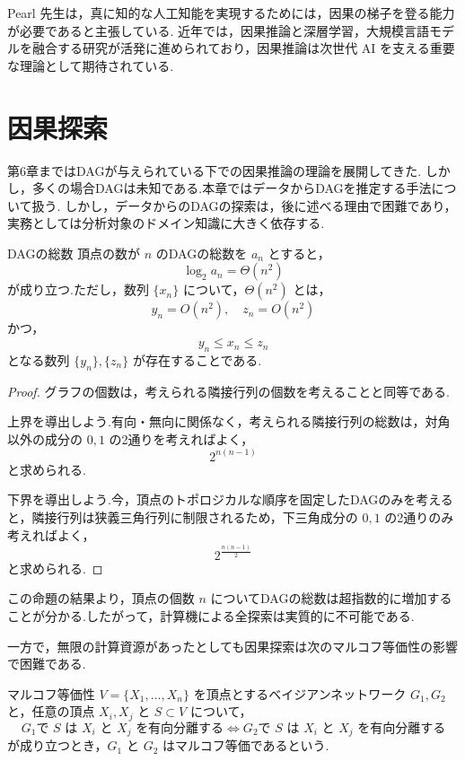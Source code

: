 \documentclass[uplatex, dvipdfmx]{jsarticle}
\begin{document}
Pearl 先生は，真に知的な人工知能を実現するためには，因果の梯子を登る能力が必要であると主張している.
近年では，因果推論と深層学習，大規模言語モデルを融合する研究が活発に進められており，因果推論は次世代 AI を支える重要な理論として期待されている.

\newpage

\section{因果探索}

第6章まではDAGが与えられている下での因果推論の理論を展開してきた.
しかし，多くの場合DAGは未知である.本章ではデータからDAGを推定する手法について扱う.
しかし，データからのDAGの探索は，後に述べる理由で困難であり，実務としては分析対象のドメイン知識に大きく依存する.

\begin{prop}{DAGの総数}
  頂点の数が $n$ のDAGの総数を $a_n$ とすると，
  \[
    \log_2 a_n=\Theta(n^2)
  \]
  が成り立つ.ただし，数列 $\{x_n\}$ について，$\Theta(n^2)$ とは，
  \[
    y_n=O(n^2),\quad
    z_n=O(n^2)
  \]
  かつ，
  \[
    y_n\le x_n\le z_n
  \]
  となる数列 $\{y_n\},\{z_n\}$ が存在することである.
\end{prop}

\begin{proof}
  グラフの個数は，考えられる隣接行列の個数を考えることと同等である.

  上界を導出しよう.有向・無向に関係なく，考えられる隣接行列の総数は，対角以外の成分の $0,1$ の2通りを考えればよく，
  \[
    2^{n(n-1)}
  \]
  と求められる.

  下界を導出しよう.今，頂点のトポロジカルな順序を固定したDAGのみを考えると，隣接行列は狭義三角行列に制限されるため，下三角成分の $0,1$ の2通りのみ考えればよく，
  \[
    2^{\frac{n(n-1)}{2}}
  \]
  と求められる.
\end{proof}

この命題の結果より，頂点の個数 $n$ についてDAGの総数は超指数的に増加することが分かる.したがって，計算機による全探索は実質的に不可能である.

一方で，無限の計算資源があったとしても因果探索は次のマルコフ等価性の影響で困難である.

\begin{defn}{マルコフ等価性}
  $V=\{X_1,\ldots,X_n\}$ を頂点とするベイジアンネットワーク
  $G_1,G_2$ と，任意の頂点 $X_i,X_j$ と
  $S\subset V$ について，
  \[
    G_1\text{で }S\text{ は }X_i\text{ と }X_j\text{ を有向分離する}
    \iff
    G_2\text{で }S\text{ は }X_i\text{ と }X_j\text{ を有向分離する}
  \]
  が成り立つとき，$G_1$ と $G_2$ はマルコフ等価であるという.
\end{defn}
\end{document}
